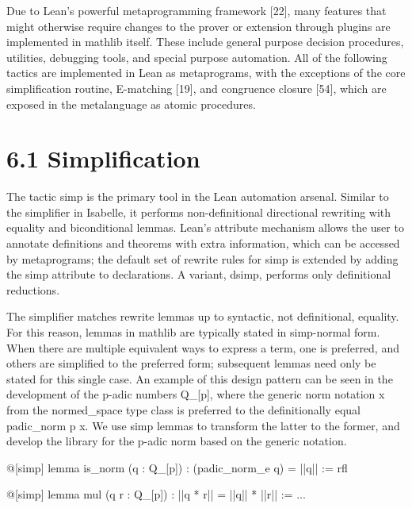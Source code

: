 \documentclass[
]{article}
\newenvironment{Shaded}{}{}
\newcommand{\NormalTok}[1]{#1}
\begin{document}
Due to Lean's powerful metaprogramming framework {[}22{]}, many features
that might otherwise require changes to the prover or extension through
plugins are implemented in mathlib itself. These include general purpose
decision procedures, utilities, debugging tools, and special purpose
automation. All of the following tactics are implemented in Lean as
metaprograms, with the exceptions of the core simplification routine,
E-matching {[}19{]}, and congruence closure {[}54{]}, which are exposed
in the metalanguage as atomic procedures.

\section{6.1 Simplification}\label{simplification}

The tactic simp is the primary tool in the Lean automation arsenal.
Similar to the simplifier in Isabelle, it performs non-definitional
directional rewriting with equality and biconditional lemmas. Lean's
attribute mechanism allows the user to annotate definitions and theorems
with extra information, which can be accessed by metaprograms; the
default set of rewrite rules for simp is extended by adding the simp
attribute to declarations. A variant, dsimp, performs only definitional
reductions.

The simplifier matches rewrite lemmas up to syntactic, not definitional,
equality. For this reason, lemmas in mathlib are typically stated in
simp-normal form. When there are multiple equivalent ways to express a
term, one is preferred, and others are simplified to the preferred form;
subsequent lemmas need only be stated for this single case. An example
of this design pattern can be seen in the development of the p-adic
numbers Q\_{[}p{]}, where the generic norm notation
\textbar\textbar x\textbar\textbar{} from the normed\_space type class
is preferred to the definitionally equal padic\_norm p x. We use simp
lemmas to transform the latter to the former, and develop the library
for the p-adic norm based on the generic notation.

\begin{Shaded}
\begin{Highlighting}[]
\NormalTok{@[simp] lemma is\_norm (q : Q\_[p]) :}
\NormalTok{(padic\_norm\_e q) = ||q|| := rfl}

\NormalTok{@[simp] lemma mul (q r : Q\_[p]) :}
\NormalTok{||q * r|| = ||q|| * ||r|| := ... }
\end{Highlighting}
\end{Shaded}
\end{document}
